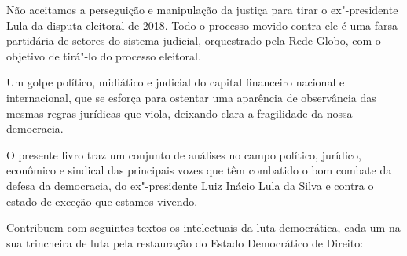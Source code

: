 Não aceitamos a perseguição e manipulação da justiça para tirar o ex"-presidente Lula
da disputa eleitoral de 2018. Todo o processo movido contra ele é uma
farsa partidária de setores do sistema judicial, orquestrado pela Rede Globo, com
o objetivo de tirá"-lo do processo eleitoral.

Um golpe político, midiático e judicial do capital financeiro nacional e internacional, que
se esforça para ostentar uma aparência de observância das mesmas regras jurídicas que
viola, deixando clara a fragilidade da nossa democracia.

\smallskip
\asterisc
\smallskip

O presente livro traz um conjunto de análises no campo político,
jurídico, econômico e sindical das principais vozes que têm combatido o bom combate da defesa
da democracia, do ex"-presidente Luiz Inácio Lula da Silva e
contra o estado de exceção que estamos vivendo.

Contribuem com seguintes textos os intelectuais da luta democrática, cada um na sua trincheira
de luta pela restauração do Estado Democrático de Direito:

